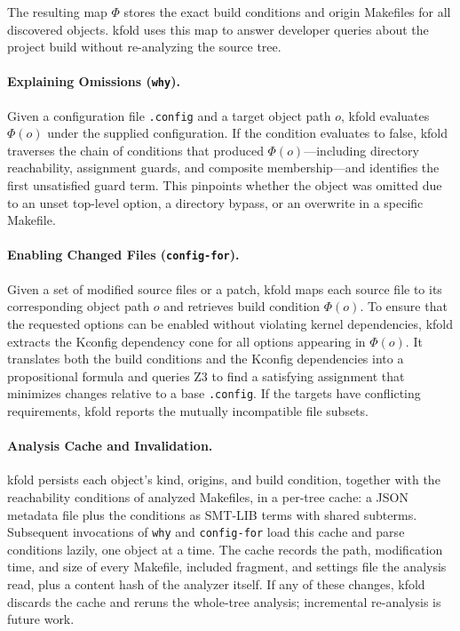 \documentclass[acmsmall]{acmart}
\newcommand{\tool}{\textsf{kfold}\xspace}
\begin{document}
The resulting map $\Phi$ stores the exact build conditions and origin Makefiles for all discovered objects.
\tool uses this map to answer developer queries about the project build without re-analyzing the source tree. 

\paragraph{Explaining Omissions (\texttt{why}).}
Given a configuration file \texttt{.config} and a target object path $o$, \tool evaluates $\Phi(o)$ under the supplied configuration.
If the condition evaluates to false, \tool traverses the chain of conditions that produced $\Phi(o)$---including directory reachability, assignment guards, and composite membership---and identifies the first unsatisfied guard term.
This pinpoints whether the object was omitted due to an unset top-level option, a directory bypass, or an overwrite in a specific Makefile.

\paragraph{Enabling Changed Files (\texttt{config-for}).}
Given a set of modified source files or a patch, \tool maps each source file to its corresponding object path $o$ and retrieves build condition $\Phi(o)$.
To ensure that the requested options can be enabled without violating kernel dependencies, \tool extracts the Kconfig dependency cone for all options appearing in $\Phi(o)$.
It translates both the build conditions and the Kconfig dependencies into a propositional formula and queries Z3 to find a satisfying assignment that minimizes changes relative to a base \texttt{.config}.
If the targets have conflicting requirements, \tool reports the mutually incompatible file subsets.

\paragraph{Analysis Cache and Invalidation.}
\tool persists each object's kind, origins, and build condition, together with the reachability conditions of analyzed Makefiles, in a per-tree cache: a JSON metadata file plus the conditions as SMT-LIB terms with shared subterms.
Subsequent invocations of \texttt{why} and \texttt{config-for} load this cache and parse conditions lazily, one object at a time.
The cache records the path, modification time, and size of every Makefile, included fragment, and settings file the analysis read, plus a content hash of the analyzer itself.
If any of these changes, \tool discards the cache and reruns the whole-tree analysis; incremental re-analysis is future work.
\end{document}
